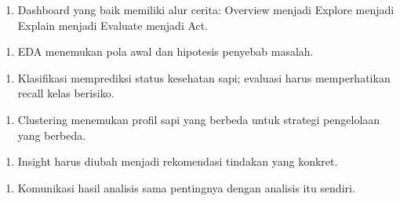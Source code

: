 \documentclass[12pt,a4paper]{article}
\begin{document}
\begin{enumerate}
\item Dashboard yang baik memiliki alur cerita: Overview  menjadi  Explore  menjadi  Explain  menjadi  Evaluate  menjadi  Act.
\end{enumerate}

\begin{enumerate}
\item EDA menemukan pola awal dan hipotesis penyebab masalah.
\end{enumerate}

\begin{enumerate}
\item Klasifikasi memprediksi status kesehatan sapi; evaluasi harus memperhatikan recall kelas berisiko.
\end{enumerate}

\begin{enumerate}
\item Clustering menemukan profil sapi yang berbeda untuk strategi pengelolaan yang berbeda.
\end{enumerate}

\begin{enumerate}
\item Insight harus diubah menjadi rekomendasi tindakan yang konkret.
\end{enumerate}

\begin{enumerate}
\item Komunikasi hasil analisis sama pentingnya dengan analisis itu sendiri.
\end{enumerate}
\end{document}
